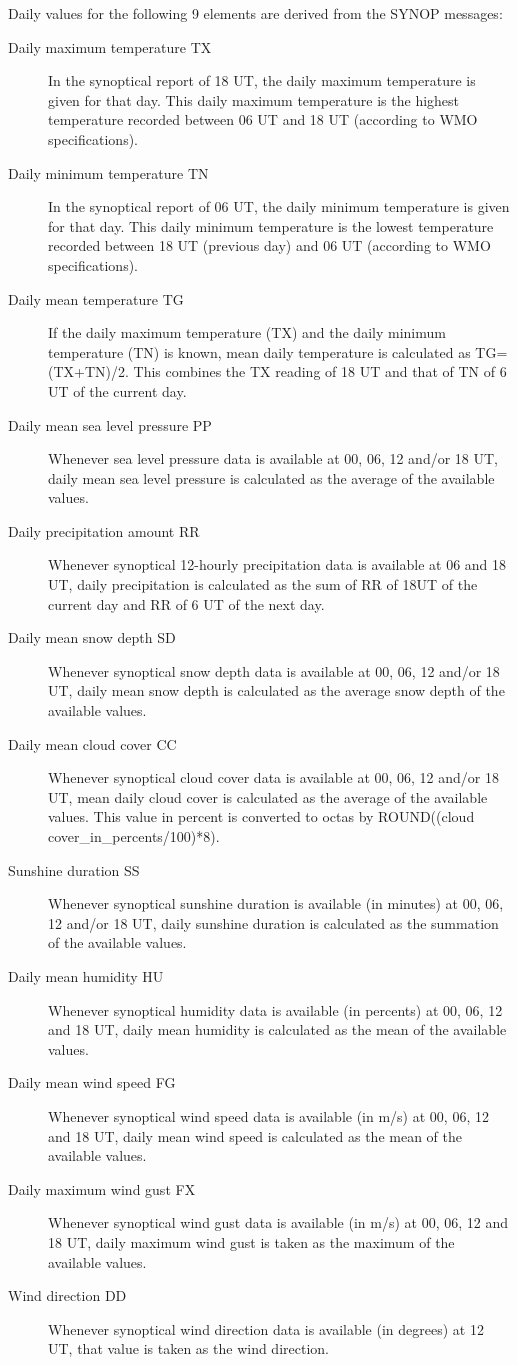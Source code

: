 \documentclass[a4paper,11pt]{article}
\begin{document}
Daily values for the following 9 elements are derived from the SYNOP
messages:

\begin{description}
\item[Daily maximum temperature TX] In the synoptical report of 18
UT, the daily maximum temperature is given for that day. This daily
maximum temperature is the highest temperature recorded between 06 UT
and 18 UT (according to WMO specifications).
\item[Daily minimum temperature TN] In the synoptical report of 06 UT,
the daily minimum temperature is given for that day. This daily
minimum temperature is the lowest temperature recorded between 18 UT
(previous day) and 06 UT (according to WMO specifications).
\item[Daily mean temperature TG] If the daily maximum temperature (TX)
and the daily minimum temperature (TN) is known, mean daily
temperature is calculated as TG=(TX+TN)/2. This combines the TX reading 
of 18 UT and that of TN of 6 UT of the current day.
\item[Daily mean sea level pressure PP] Whenever sea level pressure
data is available at 00, 06, 12 and/or 18 UT, daily mean sea level
pressure is calculated as the average of the available values.
\item[Daily precipitation amount RR] Whenever synoptical 12-hourly
precipitation data is available at 06 and 18 UT, daily precipitation
is calculated as the sum of RR of 18UT of the current day and RR of 
6 UT of the next day.
\item[Daily mean snow depth SD] Whenever synoptical snow depth data is
available at 00, 06, 12 and/or 18 UT, daily mean snow depth is calculated
as the average snow depth of the available values.
\item[Daily mean cloud cover CC] Whenever synoptical cloud cover data
is available at 00, 06, 12 and/or 18 UT, mean daily cloud cover is
calculated as the average of the available values. This value in
percent is converted to octas by ROUND((cloud
cover\_in\_percents/100)*8).
\item[Sunshine duration SS] Whenever synoptical sunshine duration is
available (in minutes) at 00, 06, 12 and/or 18 UT, daily sunshine
duration is calculated as the summation of the available values.
\item[Daily mean humidity HU] Whenever synoptical humidity data is
available (in percents) at 00, 06, 12 and 18 UT, daily mean humidity is
calculated as the mean of the available values.
\item[Daily mean wind speed FG] Whenever synoptical wind speed data is
available (in m/s) at 00, 06, 12 and 18 UT, daily mean wind speed is
calculated as the mean of the available values.
\item[Daily maximum wind gust FX] Whenever synoptical wind gust data
is available (in m/s) at 00, 06, 12 and 18 UT, daily maximum wind gust
is taken as the maximum of the available values.
\item[Wind direction DD] Whenever synoptical wind direction data is
available (in degrees) at 12 UT, that value is taken as the wind
direction.
\end{description}
\end{document}
